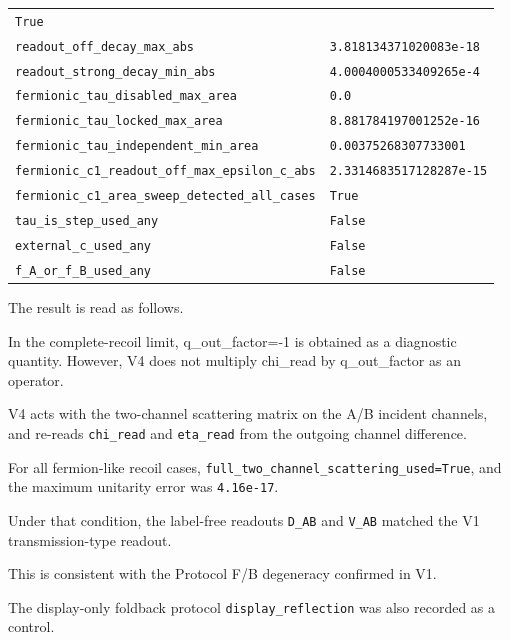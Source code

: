 \documentclass[
]{article}
\newenvironment{Shaded}{}{}
\newcommand{\NormalTok}[1]{#1}
\begin{document}
{\begin{longtable}[]{@{}
  >{\raggedright\arraybackslash}p{}
  >{\raggedleft\arraybackslash}p{}@{}}
\texttt{True} \\
\texttt{readout\_off\_decay\_max\_abs} &
\texttt{3.818134371020083e-18} \\
\texttt{readout\_strong\_decay\_min\_abs} &
\texttt{4.0004000533409265e-4} \\
\texttt{fermionic\_tau\_disabled\_max\_area} & \texttt{0.0} \\
\texttt{fermionic\_tau\_locked\_max\_area} &
\texttt{8.881784197001252e-16} \\
\texttt{fermionic\_tau\_independent\_min\_area} &
\texttt{0.00375268307733001} \\
\texttt{fermionic\_c1\_readout\_off\_max\_epsilon\_c\_abs} &
\texttt{2.3314683517128287e-15} \\
\texttt{fermionic\_c1\_area\_sweep\_detected\_all\_cases} &
\texttt{True} \\
\texttt{tau\_is\_step\_used\_any} & \texttt{False} \\
\texttt{external\_c\_used\_any} & \texttt{False} \\
\texttt{f\_A\_or\_f\_B\_used\_any} & \texttt{False} \\
\end{longtable}
}

The result is read as follows.

\begin{Shaded}
\begin{Highlighting}[]
\NormalTok{In the complete{-}recoil limit, q\_out\_factor={-}1 is obtained as a diagnostic quantity.}
\NormalTok{However, V4 does not multiply chi\_read by q\_out\_factor as an operator.}
\end{Highlighting}
\end{Shaded}

V4 acts with the two-channel scattering matrix on the A/B incident
channels, and re-reads \texttt{chi\_read} and \texttt{eta\_read} from
the outgoing channel difference.

For all fermion-like recoil cases,
\texttt{full\_two\_channel\_scattering\_used=True}, and the maximum
unitarity error was \texttt{4.16e-17}.

Under that condition, the label-free readouts \texttt{D\_AB} and
\texttt{V\_AB} matched the V1 transmission-type readout.

This is consistent with the Protocol F/B degeneracy confirmed in V1.

The display-only foldback protocol \texttt{display\_reflection} was also
recorded as a control.
\end{document}
